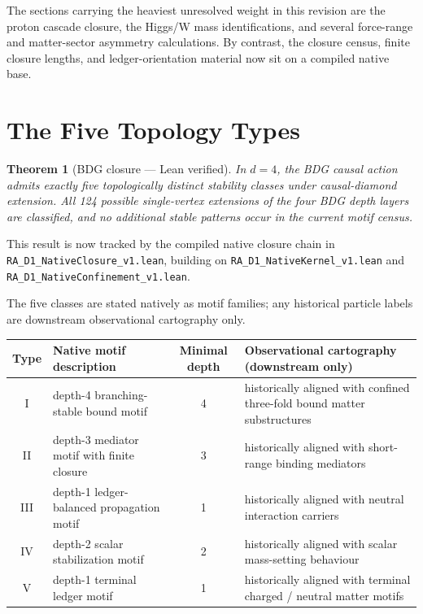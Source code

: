 \documentclass[11pt]{article}
\newtheorem{theorem}{Theorem}
\begin{document}
The sections carrying the heaviest unresolved weight in this revision are the proton cascade closure, the Higgs/W mass identifications, and several force-range and matter-sector asymmetry calculations. By contrast, the closure census, finite closure lengths, and ledger-orientation material now sit on a compiled native base.

\section{The Five Topology Types}
\label{sec:five_types}

\begin{theorem}[BDG closure --- Lean verified]
\label{thm:closure}
In $d=4$, the BDG causal action admits exactly five topologically distinct stability classes under causal-diamond extension. All 124 possible single-vertex extensions of the four BDG depth layers are classified, and no additional stable patterns occur in the current motif census.
\end{theorem}

This result is now tracked by the compiled native closure chain in \texttt{RA\_D1\_NativeClosure\_v1.lean}, building on \texttt{RA\_D1\_NativeKernel\_v1.lean} and \texttt{RA\_D1\_NativeConfinement\_v1.lean}.

The five classes are stated natively as motif families; any historical particle labels are downstream observational cartography only.

\begin{center}
\begin{tabular}{clcl}
\toprule
Type & Native motif description & Minimal depth & Observational cartography (downstream only) \\
\midrule
I & depth-4 branching-stable bound motif & 4 & historically aligned with confined three-fold bound matter substructures \\
II & depth-3 mediator motif with finite closure & 3 & historically aligned with short-range binding mediators \\
III & depth-1 ledger-balanced propagation motif & 1 & historically aligned with neutral interaction carriers \\
IV & depth-2 scalar stabilization motif & 2 & historically aligned with scalar mass-setting behaviour \\
V & depth-1 terminal ledger motif & 1 & historically aligned with terminal charged / neutral matter motifs \\
\bottomrule
\end{tabular}
\end{center}
\end{document}

